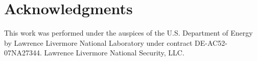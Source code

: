 \section*{Acknowledgments}
This work was performed under the auspices of the U.S. Department of Energy by Lawrence
Livermore National Laboratory under contract DE-AC52-07NA27344. Lawrence Livermore
National Security, LLC.
